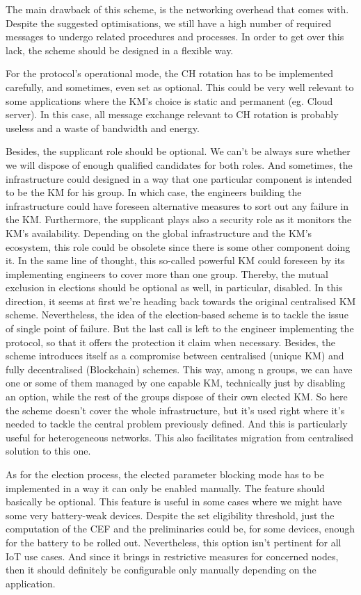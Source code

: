 The main drawback of this scheme, is the networking overhead that comes with. Despite the suggested optimisations, we still have a high number of required messages to undergo related procedures and processes. In order to get over this lack, the scheme should be designed in a flexible way.

For the protocol’s operational mode, the CH rotation has to be implemented carefully, and sometimes, even set as optional. This could be very well relevant to some applications where the KM’s choice is static and permanent (eg. Cloud server). In this case, all message exchange relevant to CH rotation is probably useless and a waste of bandwidth and energy.

Besides, the supplicant role should be optional. We can’t be always sure whether we will dispose of enough qualified candidates for both roles. And sometimes, the infrastructure could designed in a way that one particular component is intended to be the KM for his group. In which case, the engineers building the infrastructure could have foreseen alternative measures to sort out any failure in the KM. Furthermore, the supplicant plays also a security role as it monitors the KM’s availability. Depending on the global infrastructure and the KM’s ecosystem, this role could be obsolete since there is some other component doing it. In the same line of thought, this so-called powerful KM could foreseen by its implementing engineers to cover more than one group. Thereby, the mutual exclusion in elections should be optional as well, in particular, disabled. In this direction, it seems at first we’re heading back towards the original centralised KM scheme. Nevertheless, the idea of the election-based scheme is to tackle the issue of single point of failure. But the last call is left to the engineer implementing the protocol, so that it offers the protection it claim when necessary. Besides, the scheme introduces itself as a compromise between centralised (unique KM) and fully decentralised (Blockchain) schemes. This way, among n groups, we can have one or some of them managed by one capable KM, technically just by disabling an option, while the rest of the groups dispose of their own elected KM. So here the scheme doesn’t cover the whole infrastructure, but it’s used right where it’s needed to tackle the central problem previously defined. And this is particularly useful for heterogeneous networks. This also facilitates migration from centralised solution to this one.

As for the election process, the elected parameter blocking mode has to be implemented in a way it can only be enabled manually. The feature should basically be optional. This feature is useful in some cases where we might have some very battery-weak devices. Despite the set eligibility threshold, just the computation of the CEF and the preliminaries could be, for some devices, enough for the battery to be rolled out. Nevertheless, this option isn’t pertinent for all IoT use cases. And since it brings in restrictive measures for concerned nodes, then it should definitely be configurable only manually depending on the application.

